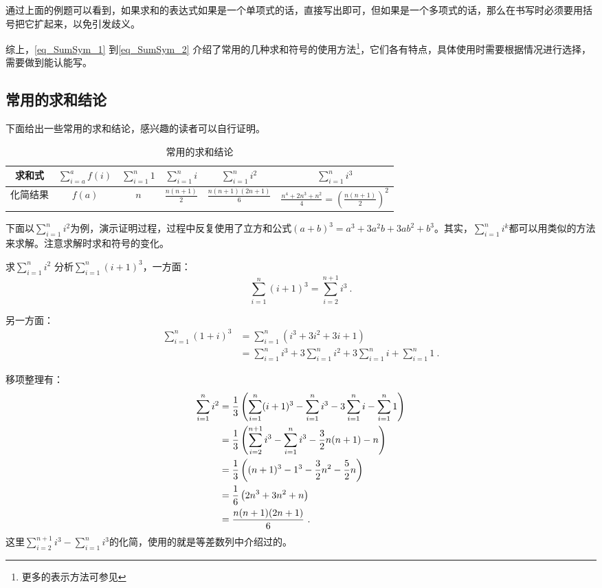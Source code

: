 通过上面的例题可以看到，如果求和的表达式如果是一个单项式的话，直接写出即可，但如果是一个多项式的话，那么在书写时必须要用括号把它扩起来，以免引发歧义。


综上，\autoref{eq_SumSym_1} 到\autoref{eq_SumSym_2} 介绍了常用的几种求和符号的使用方法\footnote{更多的表示方法可参见}，它们各有特点，具体使用时需要根据情况进行选择，需要做到能认能写。

\subsection{常用的求和结论}

下面给出一些常用的求和结论，感兴趣的读者可以自行证明。
\begin{table}[ht]
\centering
\caption{常用的求和结论}\label{tab_SumSym2}
\begin{tabular}{|c|c|c|c|c|c|}
\hline
求和式 &$\displaystyle\sum\limits_{i=a}^a f(i)$ & $\displaystyle\sum\limits_{i=1}^n 1$ & $\displaystyle\sum\limits_{i=1}^n i$ & $\displaystyle\sum\limits_{i=1}^n i^2$ & $\displaystyle\sum\limits_{i=1}^n i^3$  \\
\hline
化简结果 &$f(a)$ & $n$ & $\displaystyle\frac{n(n+1)}{2}$ & $\displaystyle\frac{n(n+1)(2n+1)}{6}$ & $\displaystyle\frac{n^4+2n^3+n^2}{4}= \left( \frac{n(n+1)}{2} \right)^2$ \\
\hline
\end{tabular}
\end{table}
下面以$\displaystyle\sum\limits_{i=1}^n i^2$为例，演示证明过程，过程中反复使用了立方和公式$(a+b)^3=a^3+3a^2b+3ab^2+b^3$。其实，$\displaystyle\sum\limits_{i=1}^n i^k$都可以用类似的方法来求解。注意求解时求和符号的变化。

\begin{example}{求$\displaystyle\sum\limits_{i=1}^n i^2$}
分析$\displaystyle\sum\limits_{i=1}^n (i+1)^3$，一方面：
$$\displaystyle\sum\limits_{i=1}^n (i+1)^3=\sum\limits_{i=2}^{n+1} i^3~.$$

另一方面：
$$\begin{align*}
\displaystyle\sum\limits_{i=1}^n (1+i)^3&= \sum\limits_{i=1}^n (i^3+3i^2+3i+1) \\
&= \sum\limits_{i=1}^n i^3+3\sum\limits_{i=1}^n i^2+3\sum\limits_{i=1}^n i+\sum\limits_{i=1}^n 1~.
\end{align*}$$

移项整理有：
$$\begin{align*}
\displaystyle\sum\limits_{i=1}^n i^2&={1\over3} \left(\sum\limits_{i=1}^n (i+1)^3-\sum\limits_{i=1}^n i^3-3\sum\limits_{i=1}^n i-\sum\limits_{i=1}^n 1\right)\\
&={1\over3} \left(\sum\limits_{i=2}^{n+1} i^3-\sum\limits_{i=1}^n i^3-\frac{3}{2}n(n+1)-n\right)\\
&={1\over3} \left((n+1)^3-1^3-{3\over2}n^2-{5\over2}n\right)\\
&={1\over6} \left(2n^3+3n^2+n\right)\\
&=\frac{n(n+1)(2n+1)}{6}~.
\end{align*}$$
这里$\displaystyle\sum\limits_{i=2}^{n+1} i^3-\sum\limits_{i=1}^n i^3$的化简，使用的就是等差数列中介绍过的。
\end{example}

